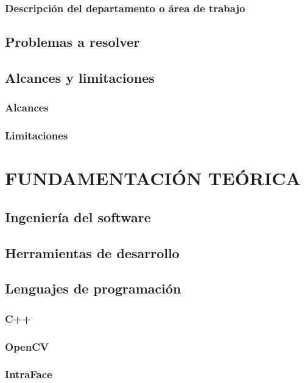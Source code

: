 \documentclass[12pt]{book} %
\begin{document}
	
	\subsection{Descripción del departamento o área de trabajo}

\newpage
\section{Problemas a resolver}

\newpage
\section{Alcances y limitaciones}
	\subsection{Alcances}
	\subsection{Limitaciones}




\chapter{FUNDAMENTACIÓN TEÓRICA}
\thispagestyle{empty}

\section{Ingeniería del software}

\section{Herramientas de desarrollo}
	
\section{Lenguajes de programación}
		\subsection{C++}
		\subsection{OpenCV}
		\subsection{IntraFace}
\end{document}
